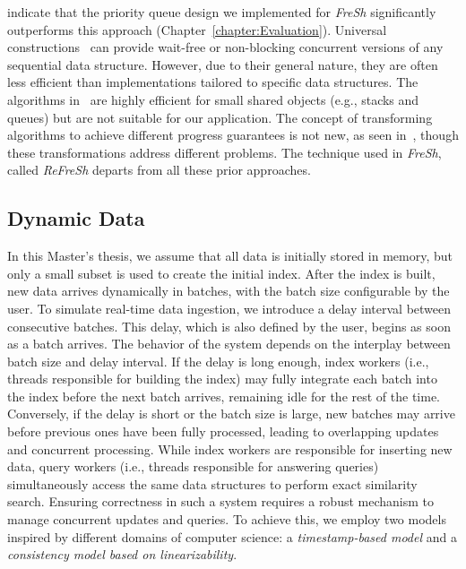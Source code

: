 \documentclass[a4paper,11pt,twoside,openany]{book}
\begin{document}
indicate that the priority queue design we implemented for \textit{FreSh} significantly
outperforms this approach (Chapter~\ref{chapter:Evaluation}).
% 
Universal constructions~\cite{FK11spaa, FK12ppopp, FK14, FK17opodis, FK09, FK20,
FKK18, EF+16, FKK22} can provide wait-free or non-blocking concurrent versions of any
sequential data structure. However, due to their general nature, they are often less
efficient than implementations tailored to specific data structures. The algorithms
in~\cite{FK11spaa, FK14, FKK22} are highly efficient for small shared objects
(e.g., stacks and queues) but are not suitable for our application.
% 
The concept of transforming algorithms to achieve different progress guarantees is not
new, as seen in~\cite{SP14, ELM05, GKK06}, though these transformations address different
problems. The technique used in \textit{FreSh}, called \textit{ReFreSh}  departs from all these
prior approaches.

\subsection{Dynamic Data}  
In this Master's thesis, we assume that all data is initially stored in memory, but
only a small subset is used to create the initial index. After the index is built,
new data arrives dynamically in batches, with the batch size configurable by the user.
To simulate real-time data ingestion, we introduce a delay interval between consecutive batches.
This delay, which is also defined by the user, begins as soon as a batch arrives.
% 
The behavior of the system depends on the interplay between batch size and delay interval.
If the delay is long enough, index workers (i.e., threads responsible for building the index)
may fully integrate each batch into the index before the next batch arrives, remaining idle for
the rest of the time. Conversely, if the delay is short or the batch size is large, new batches
may arrive before previous ones have been fully processed, leading to overlapping updates and
concurrent processing.  
% 
While index workers are responsible for inserting new data, query workers (i.e., threads
responsible for answering queries) simultaneously access the same data structures to perform
exact similarity search. Ensuring correctness in such a system requires a robust mechanism to
manage concurrent updates and queries. To achieve this, we employ two models inspired by different
domains of computer science: a \textit{timestamp-based model} and a \textit{consistency model based
on linearizability}.  
\end{document}
